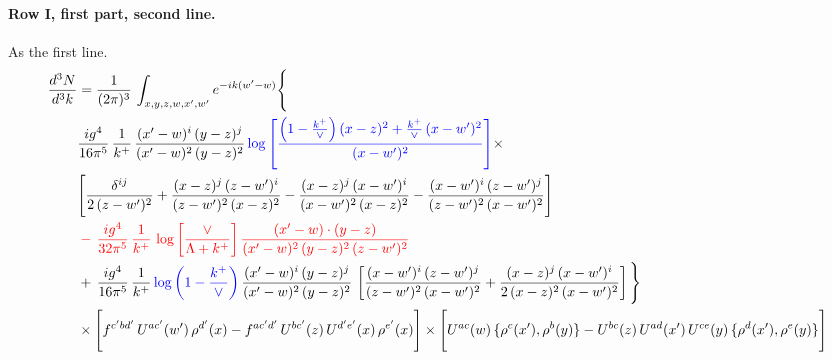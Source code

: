 \documentclass[10pt]{article}
\numberwithin{equation}{section}
\newcommand{\new}[1]{{\color{blue}#1}}
\newcommand{\rc}{\color{red}}
\begin{document}
\paragraph{Row I, first part, second line.}
As the first line.
\begin{align}
\frac{d^{3}N}{d^{3}k} & =  \frac{1}{(2\pi)^{3}}\,\int_{x,y,z,w,x',w^{\prime}} e^{-ik(w^{\prime}-w)}\Bigg\{\notag \\
&  \frac{ig^{4}}{16\pi^{5}}\,\frac{1}{k^{+}}\, \frac{(x'-w)^{i}\,(y-z)^{j}}{(x'-w)^{2}\,(y-z)^{2}}\,\new{\log{\left[\frac{\left(1-\frac{k^{+}}{\vee}\right)(x-z)^{2}+\frac{k^{+}}{\vee}\,(x-w')^{2}}{(x-w')^{2}}\right]}}\times\notag \\ &  \Bigg[\frac{\delta^{ij}}{2\,(z-w')^{2}}+\frac{(x-z)^{j}\,(z-w')^{i}}{(z-w')^{2}\,(x-z)^{2}}-\frac{(x-z)^{j}\,(x-w')^{i}}{(x-w')^{2}\,(x-z)^{2}}-\frac{(x-w')^{i}\,(z-w')^{j}}{(z-w')^{2}\,(x-w')^{2}}\Bigg] \notag \\
& \rc  -\,\frac{ig^{4}}{32\pi^{5}}\,\frac{1}{k^{+}}\,\log{\left[\frac{\vee}{\Lambda + k^{+}}\right]}\, \frac{(x'-w)\cdot (y-z)}{(x'-w)^{2}\,(y-z)^{2}\,(z-w')^{2}} \notag \\
& +\,\frac{ig^{4}}{16\pi^{5}}\,\frac{1}{k^{+}}\,\new{\log{\left(1-\frac{k^{+}}{\vee}\right)}}\,\frac{(x'-w)^{i}\,(y-z)^{j}}{(x'-w)^{2}\,(y-z)^{2}}\,\left[\frac{(x-w')^{i}\,(z-w')^{j}}{(z-w')^{2}\,(x-w')^{2}}+\frac{(x-z)^{j}\,(x-w')^{i}}{2\,(x-z)^{2}\, (x-w')^{2}}\right]\Bigg\} \notag \\ & \times\Bigg[f^{c'bd'}\,U^{ac'}(w')\,\rho^{d'}(x)-f^{ac'd'}\, U^{bc'}(z)\,U^{d'e'}(x)\,\rho^{e'}(x)\Bigg] \times \Bigg[U^{ac}(w)\,\{\rho^{c}(x'),\rho^{b}(y)\}-U^{bc}(z)\,U^{ad}(x')\,U^{ce}(y)\, \{\rho^{d}(x'),\rho^{e}(y)\}\Bigg] \label{eq:F:G2I1B}
\end{align}
\end{document}

